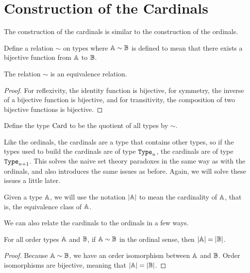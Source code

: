 \documentclass[../../math.tex]{subfiles}
\begin{document}
\section{Construction of the Cardinals}

The construction of the cardinals is similar to the construction of the
ordinals.

\begin{definition}
    Define a relation $\sim$ on types where $\mathbb{A} \sim \mathbb{B}$ is defined to mean that
    there exists a bijective function from $\mathbb{A}$ to $\mathbb{B}$.
\end{definition}

\begin{lemma}
    The relation $\sim$ is an equivalence relation.
\end{lemma}
\begin{proof}
    For reflexivity, the identity function is bijective, for symmetry, the
    inverse of a bijective function is bijective, and for transitivity, the
    composition of two bijective functions is bijective.
\end{proof}

\begin{definition}
    Define the type $\operatorname{Card}$ to be the quotient of all types by $\sim$.
\end{definition}

Like the ordinals, the cardinals are a type that contains other types, so if the
types used to build the cardinals are of type $\Type_n$, the cardinals are of
type $\Type_{n+1}$.  This solves the naive set theory paradoxes in the same way
as with the ordinals, and also introduces the same issues as before.  Again, we
will solve these issues a little later.

\begin{definition}
    Given a type $\mathbb{A}$, we will use the notation $|\mathbb{A}|$ to mean the cardinality
    of $\mathbb{A}$, that is, the equivalence class of $\mathbb{A}$.
\end{definition}

We can also relate the cardinals to the ordinals in a few ways.

\begin{lemma}
    For all order types $\mathbb{A}$ and $\mathbb{B}$, if $\mathbb{A} \sim \mathbb{B}$ in the ordinal sense,
    then $|\mathbb{A}| = |\mathbb{B}|$.
\end{lemma}
\begin{proof}
    Because $\mathbb{A} \sim \mathbb{B}$, we have an order isomorphism between $\mathbb{A}$ and $\mathbb{B}$.
    Order isomorphisms are bijective, meaning that $|\mathbb{A}| = |\mathbb{B}|$.
\end{proof}
\end{document}
